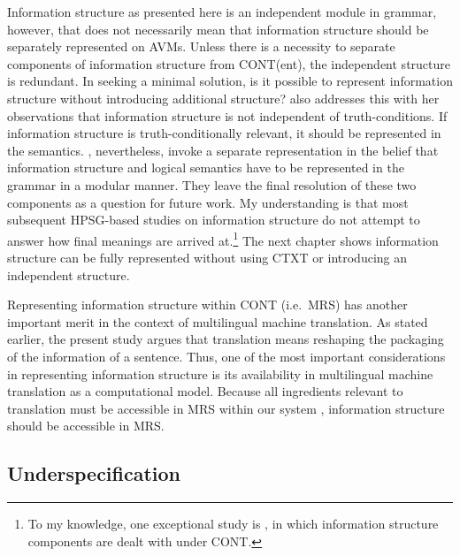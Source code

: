 Information structure as presented here is an independent module in
grammar, however, that does not necessarily mean that information
structure should be separately represented on AVMs. Unless there is a
necessity to separate components of information structure from
CONT(ent), the independent structure is redundant.  In seeking a
minimal solution, is it possible to represent information structure
without introducing additional structure?  \citet{partee:91} also
addresses this with her observations that information structure is not
independent of truth-conditions. If information
structure is truth-conditionally relevant, it should be represented in
the semantics.  \citet{engdahl:vallduvi:96}, nevertheless, invoke
a separate representation in the belief that information structure and
logical semantics have to be represented in the grammar in a modular
manner. They leave the final resolution of these two components as a
question for future work. My understanding is that most
subsequent HPSG-based studies on information structure do not attempt
to answer how final meanings are arrived at.\footnote{To my knowledge,
  one exceptional study is \citet{webelhuth:07}, in which information
  structure components are dealt with under CONT.}  The next chapter
shows information structure can be fully represented without using
CTXT or introducing an independent structure.




Representing information structure within CONT (i.e.\ MRS) has
another important merit in the context of multilingual machine
translation. As stated earlier, the present study argues that
translation means reshaping the packaging of the information of a
sentence.  Thus, one of the most important considerations in
representing information structure is its availability in multilingual
machine translation as a computational model. Because all ingredients
relevant to translation must be accessible in MRS within our
 system \citep{oepen:etal:07}, information
structure should be accessible in MRS.




\subsection{Underspecification}
\label{8:ssec:underspecification}


